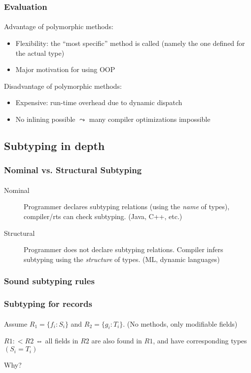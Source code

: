 \documentclass{beamer}
\begin{document}
\begin{frame}[fragile]
\frametitle{Evaluation}
\framesubtitle{}
Advantage of polymorphic methods: 
\begin{itemize}
\item Flexibility: the ``most specific'' method is called
(namely the one defined for the actual type)
\item Major motivation for using OOP
\end{itemize}
\bigskip

Disadvantage of polymorphic methods: 
\begin{itemize}
\item Expensive: run-time overhead due to dynamic dispatch
\item No inlining possible $\leadsto$ many compiler optimizations
impossible
\end{itemize}

\end{frame}


\subsection{Subtyping in depth}


\begin{frame}
\frametitle{Nominal vs. Structural Subtyping}
\framesubtitle{}

\begin{description}

\item[Nominal] Programmer declares subtyping relations (using the \emph{name}
of types), compiler/rts can check subtyping. (Java, C++, etc.)

\item[Structural] Programmer does not declare subtyping relations. Compiler
infers subtyping using the \emph{structure} of types. (ML, dynamic languages)

\end{description}

\end{frame}

\subsubsection{Sound subtyping rules}

\begin{frame}
\frametitle{Subtyping for records}
\framesubtitle{}

Assume $R_1 = \{f_i : S_i\}$ and $R_2 = \{g_i : T_i\}$.
(No methods, only modifiable fields)

$R1 :< R2$ ⇔ all fields in $R2$ are also found in $R1$, and have corresponding types $(S_i = T_i)$

Why?
\end{frame}
\end{document}
